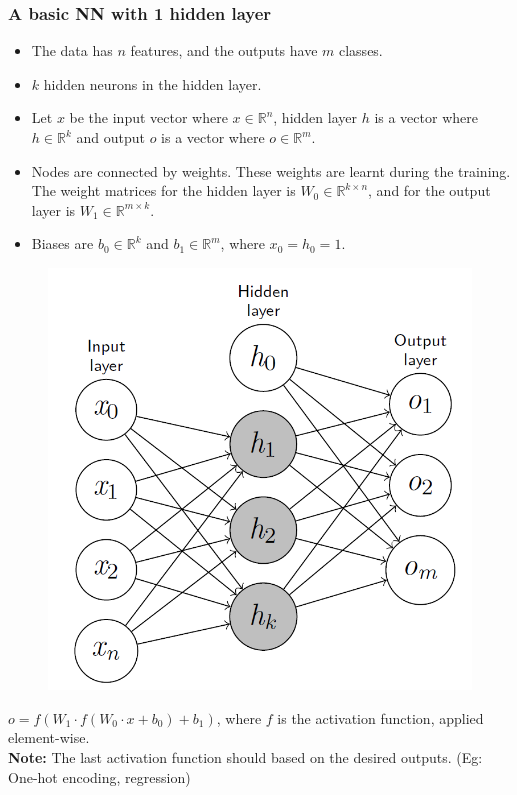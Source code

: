 \documentclass[aspectratio=169, 10pt]{beamer}
\begin{document}
\begin{frame}
    \frametitle{A basic NN with 1 hidden layer}
    
    \begin{itemize}
        \item The data has $n$ features, and the outputs have $m$ classes.
        \item $k$ hidden neurons in the hidden layer.
        \item Let $x$ be the input vector where $x \in \mathbb{R}^n$, hidden layer $h$ is a vector where $h \in \mathbb{R}^k$ and output $o$ is a vector where $o \in \mathbb{R}^m$.
        \item Nodes are connected by weights. These weights are learnt during the training. The weight matrices for the hidden layer is $W_0 \in \mathbb{R}^{k \times n}$, and for the output layer is $W_1 \in \mathbb{R}^{m \times k}$.
        \item Biases are $b_0 \in \mathbb{R}^k$ and $b_1 \in \mathbb{R}^m$, where $x_0 = h_0 = 1$.
    \end{itemize}

    \begin{figure}
        \centering
        \includegraphics[width=0.18\columnwidth]{../imgs/nn_01.png}
    \end{figure}

    $o = f(W_1 \cdot f(W_0 \cdot x + b_0) + b_1)$, where $f$ is the activation function, applied element-wise.\\

    \textbf{Note:} The last activation function should based on the desired outputs. (Eg: One-hot encoding, regression)
        
\end{frame}

\end{document}
